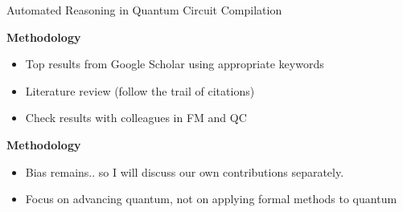 \begin{frame}{Automated Reasoning in Quantum Circuit Compilation}

\vfill


\vfill

\pause

	\begin{block}{\bf Methodology}
		\begin{itemize}
		\item Top results from Google Scholar using appropriate keywords
		\item Literature review (follow the trail of citations)
		\item Check results with colleagues in FM and QC
		\end{itemize}
	\end{block}

\pause

\vfill


	\begin{alertblock}{\bf Methodology}
		\begin{itemize}
		\item Bias remains.. so I will discuss our own contributions separately.
		\pause
		\item Focus on advancing quantum, not on applying formal methods to quantum
		\end{itemize}
	\end{alertblock}



\end{frame}



